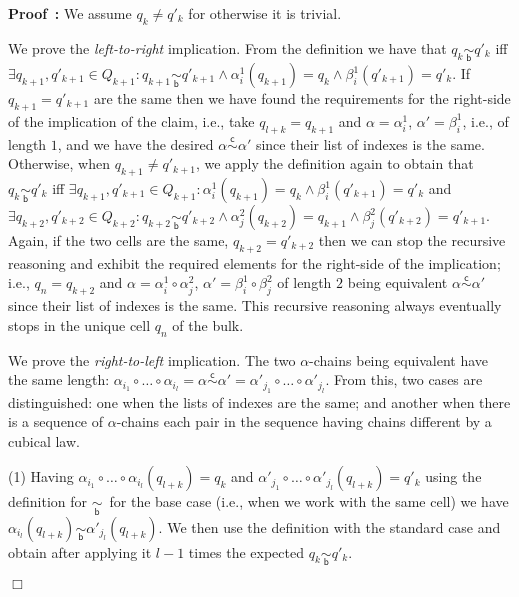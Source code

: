 \documentclass[submission,copyright,creativecommons]{eptcs}
\newenvironment{proof}[1][\!\!\,]{\vspace{1ex}\noindent\textbf{Proof #1: }}{\hfill$\Box$\vspace{2ex}}
\newcounter{case}
\newcommand\chainEquivHDAsculpture{\ensuremath{\overset{\mathsf{c}}{\sim}}}
\newcommand\cellEquivBulk{\ensuremath{\underset{\mathsf{b}}{\sim}}}
\begin{document}
\begin{proof}
We assume $q_{k}\neq q'_{k}$ for otherwise it is trivial.

We prove the \textit{left-to-right} implication.
From the definition we have that $q_{k}\cellEquivBulk q'_{k}$ iff 
$\exists q_{k+1},q'_{k+1}\in Q_{k+1}:q_{k+1}\cellEquivBulk q'_{k+1}\wedge \alpha_{i}^{1}(q_{k+1})=q_{k}\wedge \beta_{i}^{1}(q'_{k+1})=q'_{k}$.
If $q_{k+1}=q'_{k+1}$ are the same then we have found the requirements for the right-side of the implication of the claim, i.e., take $q_{l+k}=q_{k+1}$ and $\alpha=\alpha_{i}^{1}$, $\alpha'=\beta_{i}^{1}$, i.e., of length $1$, and we have the desired $\alpha\chainEquivHDAsculpture\alpha'$ since their list of indexes is the same.
Otherwise, when $q_{k+1}\neq q'_{k+1}$, we apply the definition again to obtain that $q_{k}\cellEquivBulk q'_{k}$ iff  
$\exists q_{k+1},q'_{k+1}\in Q_{k+1}:\alpha_{i}^{1}(q_{k+1})=q_{k}\wedge \beta_{i}^{1}(q'_{k+1})=q'_{k}$ and 
$\exists q_{k+2},q'_{k+2}\in Q_{k+2}:q_{k+2}\cellEquivBulk q'_{k+2}\wedge \alpha_{j}^{2}(q_{k+2})=q_{k+1}\wedge \beta_{j}^{2}(q'_{k+2})=q'_{k+1}$.
Again, if the two cells are the same, $q_{k+2}=q'_{k+2}$ then we can stop the recursive reasoning and exhibit the required elements for the right-side of the implication; i.e., $q_{n}=q_{k+2}$ and $\alpha=\alpha_{i}^{1}\circ\alpha_{j}^{2}$, $\alpha'=\beta_{i}^{1}\circ\beta_{j}^{2}$ of length $2$ being equivalent $\alpha\chainEquivHDAsculpture\alpha'$ since their list of indexes is the same.
This recursive reasoning always eventually stops in the unique cell $q_{n}$ of the bulk.

We prove the \textit{right-to-left} implication.
The two $\alpha$-chains being equivalent have the same length: $\alpha_{i_{1}}\circ\dots\circ\alpha_{i_{l}}=\alpha\chainEquivHDAsculpture\alpha'=\alpha'_{j_{1}}\circ\dots\circ\alpha'_{j_{l}}$. From this, two cases are distinguished: one when the lists of indexes are the same; and another when there is a sequence of $\alpha$-chains each pair in the sequence having chains different by a cubical law.

(1) Having $\alpha_{i_{1}}\circ\dots\circ\alpha_{i_{l}}(q_{l+k})=q_{k}$ and $\alpha'_{j_{1}}\circ\dots\circ\alpha'_{j_{l}}(q_{l+k})=q'_{k}$ using the definition for \cellEquivBulk\ for the base case (i.e., when we work with the same cell) we have $\alpha_{i_{l}}(q_{l+k})\cellEquivBulk\alpha'_{j_{l}}(q_{l+k})$. We then use the definition with the standard case and obtain after applying it $l-1$ times the expected $q_{k}\cellEquivBulk q'_{k}$.


\end{proof}
\end{document}
